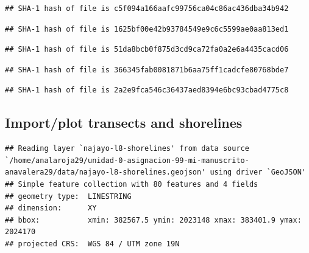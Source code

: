 \documentclass[11pt,]{article}
\newenvironment{Shaded}{\begin{snugshade}}{\end{snugshade}}
\newcommand{\KeywordTok}[1]{\textcolor[rgb]{0.13,0.29,0.53}{\textbf{#1}}}
\newcommand{\DataTypeTok}[1]{\textcolor[rgb]{0.13,0.29,0.53}{#1}}
\newcommand{\StringTok}[1]{\textcolor[rgb]{0.31,0.60,0.02}{#1}}
\newcommand{\CommentTok}[1]{\textcolor[rgb]{0.56,0.35,0.01}{\textit{#1}}}
\newcommand{\OperatorTok}[1]{\textcolor[rgb]{0.81,0.36,0.00}{\textbf{#1}}}
\newcommand{\NormalTok}[1]{#1}
\begin{document}
\begin{verbatim}
## SHA-1 hash of file is c5f094a166aafc99756ca04c86ac436dba34b942
\end{verbatim}

\begin{verbatim}
## SHA-1 hash of file is 1625bf00e42b93784549e9c6c5599ae0aa813ed1
\end{verbatim}

\begin{verbatim}
## SHA-1 hash of file is 51da8bcb0f875d3cd9ca72fa0a2e6a4435cacd06
\end{verbatim}

\begin{verbatim}
## SHA-1 hash of file is 366345fab0081871b6aa75ff1cadcfe80768bde7
\end{verbatim}

\begin{verbatim}
## SHA-1 hash of file is 2a2e9fca546c36437aed8394e6bc93cbad4775c8
\end{verbatim}

\subsection{Import/plot transects and
shorelines}\label{importplot-transects-and-shorelines}

\begin{Shaded}
\end{Shaded}

\begin{verbatim}
## Reading layer `najayo-l8-shorelines' from data source `/home/analaroja29/unidad-0-asignacion-99-mi-manuscrito-anavalera29/data/najayo-l8-shorelines.geojson' using driver `GeoJSON'
## Simple feature collection with 80 features and 4 fields
## geometry type:  LINESTRING
## dimension:      XY
## bbox:           xmin: 382567.5 ymin: 2023148 xmax: 383401.9 ymax: 2024170
## projected CRS:  WGS 84 / UTM zone 19N
\end{verbatim}

\begin{Shaded}
\end{Shaded}
\end{document}
